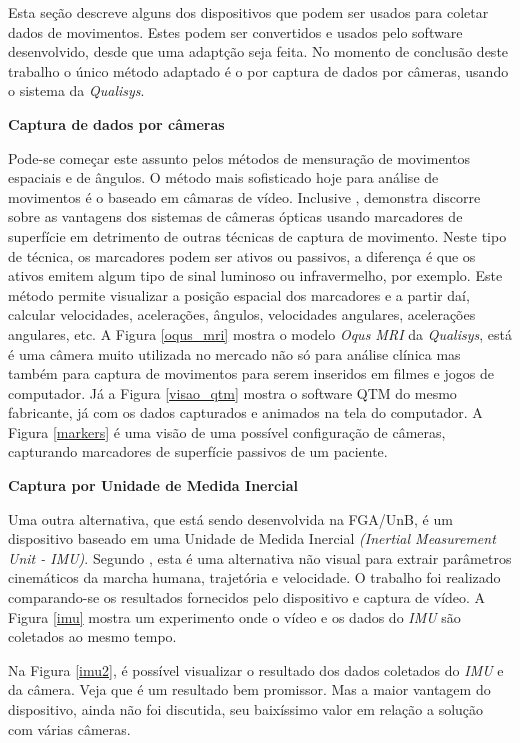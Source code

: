 Esta seção descreve alguns dos dispositivos que podem ser usados para coletar dados de movimentos. 
Estes podem ser convertidos e usados pelo software desenvolvido, desde que uma adaptção seja feita. 
No momento de conclusão deste trabalho o único método adaptado é o por captura de dados por câmeras, usando o sistema da \emph{Qualisys}.

\textbf{Captura de dados por câmeras}

Pode-se começar este assunto pelos métodos de mensuração de movimentos espaciais e de ângulos.
O método mais sofisticado hoje para análise de movimentos é o baseado em câmaras de vídeo. 
Inclusive , demonstra discorre sobre as vantagens dos sistemas de câmeras ópticas usando marcadores de superfície em detrimento de outras técnicas de captura de movimento. 
Neste tipo de técnica, os marcadores podem ser ativos ou passivos, a diferença é que os ativos emitem algum tipo de sinal luminoso ou infravermelho, por exemplo. 
Este método permite visualizar a posição espacial dos marcadores e a partir daí, calcular velocidades, acelerações, ângulos, velocidades angulares, acelerações angulares, etc.
A Figura \ref{oqus_mri} mostra o modelo \emph{Oqus MRI} da \emph{Qualisys}, está é uma câmera muito utilizada no mercado não só para análise clínica mas também para captura de movimentos para serem inseridos em filmes e jogos de computador. 
Já a Figura \ref{visao_qtm} mostra o software QTM do mesmo fabricante, já com os dados capturados e animados na tela do computador.
A Figura \ref{markers} é uma visão de uma possível configuração de câmeras, capturando marcadores de superfície passivos de um paciente.

\textbf{Captura por Unidade de Medida Inercial}

Uma outra alternativa, que está sendo desenvolvida na FGA/UnB, é um dispositivo baseado em uma Unidade de Medida Inercial \emph{(Inertial Measurement Unit - IMU)}. 
Segundo , esta é uma alternativa não visual para extrair parâmetros cinemáticos da marcha humana, trajetória e velocidade. 
O trabalho foi realizado comparando-se os resultados fornecidos pelo dispositivo e captura de vídeo.
A Figura \ref{imu} mostra um experimento onde o vídeo e os dados do \emph{IMU} são coletados ao mesmo tempo.


Na Figura \ref{imu2}, é possível visualizar o resultado dos dados coletados do \emph{IMU} e da câmera. 
Veja que é um resultado bem promissor. 
Mas a maior vantagem do dispositivo, ainda não foi discutida, seu baixíssimo valor em relação a solução com várias câmeras.

